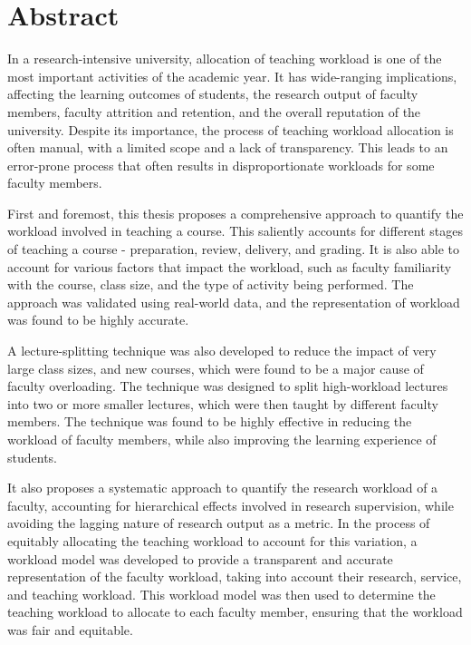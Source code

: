 
\chapter*{Abstract}

In a research-intensive university, allocation of teaching workload is one of the most important activities of the academic year. It has wide-ranging implications, affecting the learning outcomes of students, the research output of faculty members, faculty attrition and retention, and the overall reputation of the university. Despite its importance, the process of teaching workload allocation is often manual, with a limited scope and a lack of transparency. This leads to an error-prone process that often results in disproportionate workloads for some faculty members.

First and foremost, this thesis proposes a comprehensive approach to quantify the workload involved in teaching a course. This saliently accounts for different stages of teaching a course - preparation, review, delivery, and grading. It is also able to account for various factors that impact the workload, such as faculty familiarity with the course, class size, and the type of activity being performed. The approach was validated using real-world data, and the representation of workload was found to be highly accurate.

A lecture-splitting technique was also developed to reduce the impact of very large class sizes, and new courses, which were found to be a major cause of faculty overloading. The technique was designed to split high-workload lectures into two or more smaller lectures, which were then taught by different faculty members. The technique was found to be highly effective in reducing the workload of faculty members, while also improving the learning experience of students.

It also proposes a systematic approach to quantify the research workload of a faculty, accounting for hierarchical effects involved in research supervision, while avoiding the lagging nature of research output as a metric. In the process of equitably allocating the teaching workload to account for this variation, a workload model was developed to provide a transparent and accurate representation of the faculty workload, taking into account their research, service, and teaching workload. This workload model was then used to determine the teaching workload to allocate to each faculty member, ensuring that the workload was fair and equitable.

